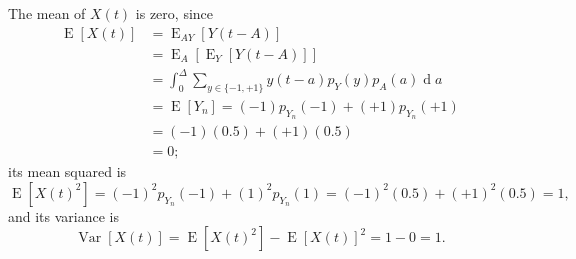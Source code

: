 \documentclass[12pt,letterpaper]{article}
\newcommand{\EE}{\operatorname{E}}
\newcommand{\VV}{\operatorname{Var}}
\newcommand{\dd}{\operatorname{d} \!}
\begin{document}
The mean of $X(t)$ is zero, since
\begin{align}
\EE [X(t)] 
&= \EE_{AY}[Y(t-A)]\\
&= \EE_{A}[\EE_{Y}[Y(t-A)]]\\
&= \int_0^\Delta \sum_{y\in \{-1, +1\}} y(t-a) p_Y(y) p_A(a) \dd a\\
&= \EE[Y_n] = (-1)p_{Y_n}(-1) + (+1)p_{Y_n}(+1)\\
&= (-1)(0.5) + (+1)(0.5)\\
& = 0;
\end{align}
its mean squared is
\begin{equation}
\EE[X(t)^2] = (-1)^2 p_{Y_n}(-1) + (1)^2 p_{Y_n}(1) = (-1)^2 (0.5) + (+1)^2(0.5) = 1,
\end{equation}
and its variance is
\begin{equation}
\VV[X(t)] = \EE[X(t)^2] - \EE[X(t)]^2 = 1 - 0 = 1.
\end{equation}
\end{document}
